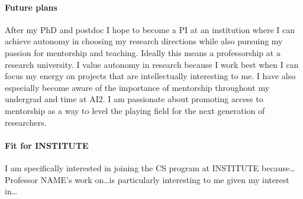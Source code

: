 \documentclass[11pt]{article}
\newcommand\inst{INSTITUTE\xspace}
\begin{document}
\paragraph{Future plans}
After my PhD and postdoc I hope to become a PI 
at an institution where I can achieve autonomy in choosing my research directions
while also pursuing my passion for mentorship and teaching.
Ideally this means a professorship at a research university.
I value autonomy in research because I work best 
when I can focus my energy on projects 
that are intellectually interesting to me.
I have also especially become aware of the importance of mentorship 
throughout my undergrad and time at AI2.
I am passionate about promoting access to mentorship 
as a way to level the playing field 
for the next generation of researchers.

\paragraph{Fit for \inst} I am specifically interested in joining the CS program at 
\inst because\ldots Professor NAME's work on\ldots is particularly interesting to me given my interest in\ldots



\end{document}
